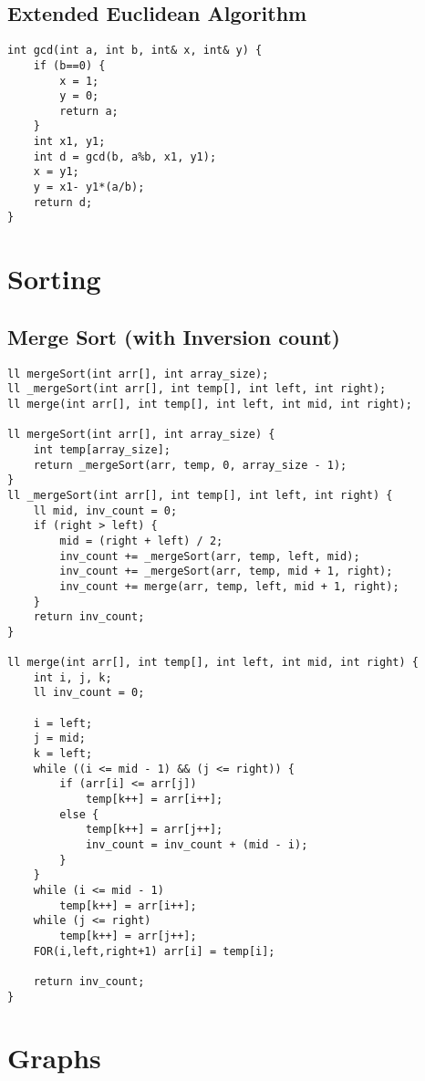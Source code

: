 \documentclass{article}
\begin{document}
\begin{multicols*}{2}
    \subsection{Extended Euclidean Algorithm}
    
    \begin{lstlisting}
int gcd(int a, int b, int& x, int& y) {
    if (b==0) {
        x = 1;
        y = 0;
        return a;
    }
    int x1, y1;
    int d = gcd(b, a%b, x1, y1);
    x = y1;
    y = x1- y1*(a/b);
    return d;
}
    \end{lstlisting}

    \section{Sorting}
        \subsection{Merge Sort (with Inversion count)}


        \begin{lstlisting}
ll mergeSort(int arr[], int array_size);
ll _mergeSort(int arr[], int temp[], int left, int right);
ll merge(int arr[], int temp[], int left, int mid, int right);

ll mergeSort(int arr[], int array_size) {
    int temp[array_size];
    return _mergeSort(arr, temp, 0, array_size - 1);
}
ll _mergeSort(int arr[], int temp[], int left, int right) {
    ll mid, inv_count = 0;
    if (right > left) {
        mid = (right + left) / 2;
        inv_count += _mergeSort(arr, temp, left, mid);
        inv_count += _mergeSort(arr, temp, mid + 1, right);
        inv_count += merge(arr, temp, left, mid + 1, right);
    }
    return inv_count;
}

ll merge(int arr[], int temp[], int left, int mid, int right) {
    int i, j, k;
    ll inv_count = 0;

    i = left;
    j = mid;
    k = left;
    while ((i <= mid - 1) && (j <= right)) {
        if (arr[i] <= arr[j])
            temp[k++] = arr[i++];
        else {
            temp[k++] = arr[j++];
            inv_count = inv_count + (mid - i);
        }
    }
    while (i <= mid - 1)
        temp[k++] = arr[i++];
    while (j <= right)
        temp[k++] = arr[j++];
    FOR(i,left,right+1) arr[i] = temp[i];

    return inv_count;
}       \end{lstlisting}


    \section{Graphs}

\end{multicols*}
\end{document}
